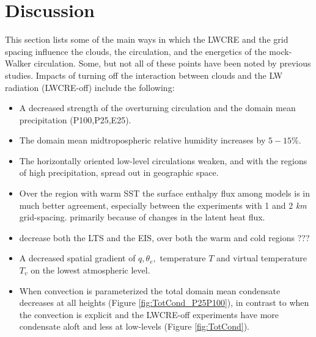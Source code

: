 \documentclass[draft]{agujournal2019}
\begin{document}
{%

\section{Discussion} %

This section lists some of the main ways in which the LWCRE and the grid spacing influence
the clouds, the circulation, and the energetics of the mock-Walker circulation.   Some, but not all of these 
points have been noted by previous studies.  
Impacts of turning off the interaction between clouds and the LW radiation (LWCRE-off) include the following: 

\begin{itemize}
  \item A decreased strength of the overturning circulation and the domain mean precipitation (P100,P25,E25).
  \item The domain mean midtropospheric relative humidity increases by $5-15 \% $.
  \item The horizontally oriented low-level circulations weaken, and with the regions of high precipitation, spread out 
  in geographic space.  
  \item Over the region with warm SST the surface enthalpy flux among models is in much better agreement, 
  especially between the experiments with 1 and 2 \textit{km} grid-spacing.
  primarily because of changes in the latent heat flux.
  \item decrease both the LTS and the EIS, over both the warm and cold regions ???
  \item A decreased spatial gradient of $q, \theta_e,$ temperature $T$ and virtual temperature $T_v$ on the lowest 
  atmospheric level.  
  \item When convection is parameterized the total domain mean condensate decreases at all heights (Figure \ref{fig:TotCond_P25P100}), in contrast to 
  when the convection is explicit and the LWCRE-off experiments have more condensate aloft and less at low-levels (Figure \ref{fig:TotCond}).    
\end{itemize}

}
\end{document}
